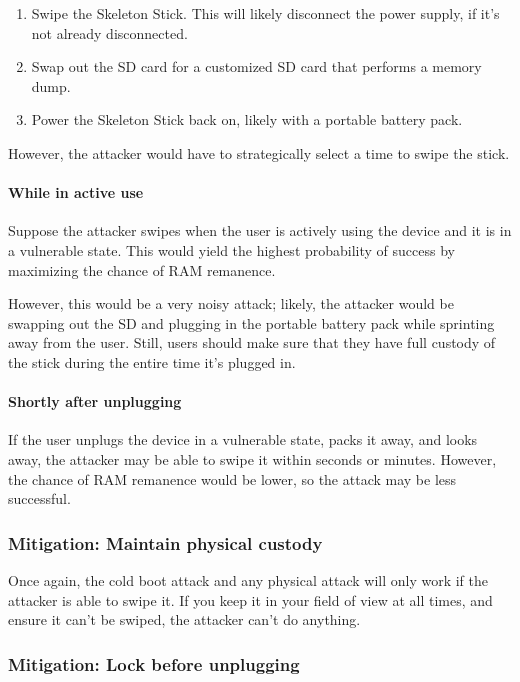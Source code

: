 \documentclass{article}
\begin{document}
\begin{enumerate}
    \item Swipe the Skeleton Stick. This will likely disconnect the power supply, if it's not already disconnected.
    \item Swap out the SD card for a customized SD card that performs a memory dump.
    \item Power the Skeleton Stick back on, likely with a portable battery pack.
\end{enumerate}

However, the attacker would have to strategically select a time to swipe the stick.

\paragraph{While in active use} Suppose the attacker swipes when the user is actively using the device and it is in a vulnerable state. This would yield the highest probability of success by maximizing the chance of RAM remanence.

However, this would be a very noisy attack; likely, the attacker would be swapping out the SD and plugging in the portable battery pack while sprinting away from the user. Still, users should make sure that they have full custody of the stick during the entire time it's plugged in.

\paragraph{Shortly after unplugging} If the user unplugs the device in a vulnerable state, packs it away, and looks away, the attacker may be able to swipe it within seconds or minutes. However, the chance of RAM remanence would be lower, so the attack may be less successful.

\subsubsection{Mitigation: Maintain physical custody}

Once again, the cold boot attack and any physical attack will only work if the attacker is able to swipe it. If you keep it in your field of view at all times, and ensure it can't be swiped, the attacker can't do anything.

\subsubsection{Mitigation: Lock before unplugging}
\end{document}
